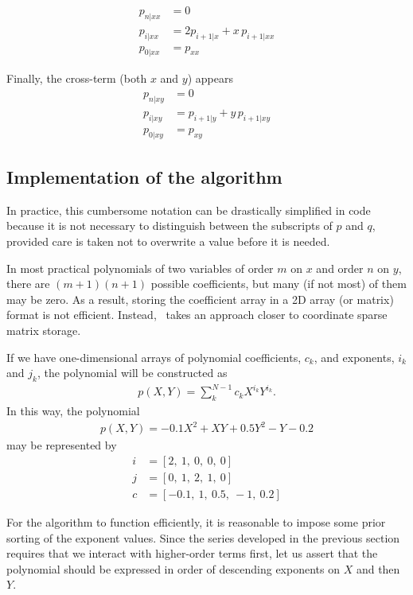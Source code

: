 \begin{subequations}
\begin{align}
p_{n|xx} &= 0\\
p_{i|xx} &= 2 p_{i+1|x} + x\,p_{i+1|xx}\\
p_{0|xx} &= p_{xx}
\end{align}
\end{subequations}

Finally, the cross-term (both $x$ and $y$) appears
\begin{subequations}
\begin{align}
p_{n|xy} &= 0\\
p_{i|xy} &= p_{i+1|y} + y\,p_{i+1|xy}\\
p_{0|xy} &= p_{xy}
\end{align}
\end{subequations}

\subsection{Implementation of the algorithm}
In practice, this cumbersome notation can be drastically simplified in code because it is not necessary to distinguish between the subscripts of $p$ and $q$, provided care is taken not to overwrite a value before it is needed.

In most practical polynomials of two variables of order $m$ on $x$ and order $n$ on $y$, there are $(m+1)(n+1)$ possible coefficients, but many (if not most) of them may be zero.  As a result, storing the coefficient array in a 2D array (or matrix) format is not efficient.  Instead, \PM\ takes an approach closer to coordinate sparse matrix storage.

If we have one-dimensional arrays of polynomial coefficients, $c_k$, and exponents, $i_k$ and $j_k$, the polynomial will be constructed as
\begin{align}
p(X,Y) = \sum_k^{N-1} c_k X^{i_k} Y^{i_k}.
\end{align}
In this way, the polynomial
\begin{align}
p(X,Y) = -0.1 X^2 + XY + 0.5 Y^2 - Y - 0.2
\end{align}
may be represented by
\begin{align}
i &= \left[ 2,\ 1,\ 0,\ 0,\ 0\right]\\
j &= \left[ 0,\ 1,\ 2,\ 1,\ 0\right]\\
c &= \left[ -0.1,\ 1,\ 0.5,\ -1,\ 0.2\right]
\end{align}

For the algorithm to function efficiently, it is reasonable to impose some prior sorting of the exponent values.  Since the series developed in the previous section requires that we interact with higher-order terms first, let us assert that the polynomial should be expressed in order of descending exponents on $X$ and then $Y$.

